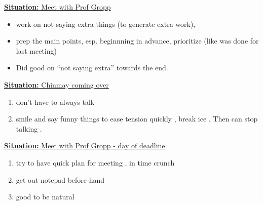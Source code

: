 \documentclass[11pt]{article}
\newcommand{\newSituation}[1]{\underline{\textbf{Situation:} #1} }
\begin{document}
\newSituation{Meet with Prof Gropp} 
\begin{itemize} 
\item work on not saying extra things (to generate extra work), 
\item prep the main points, esp. beginnning in advance, prioritize (like was done for last meeting)
\item Did good on ``not saying extra'' towards the end. 
\end{itemize} 

\newSituation{Chinmay coming over} 
\begin{enumerate} 
\item don't have to always talk 
\item smile and say funny things to ease tension quickly , break ice .  Then can stop talking . 
\end{enumerate}

\newSituation{Meet with Prof Gropp - day of deadline}
\begin{enumerate} 
\item try to have quick plan for meeting , in time crunch 
\item get out notepad before hand 
\item good to be natural 
\end{enumerate} 
\end{document}

